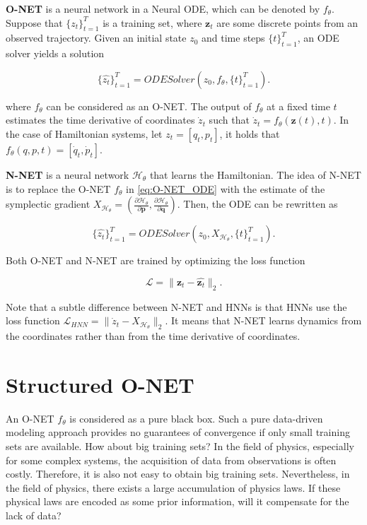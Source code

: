 \documentclass[
	parskip, 			   %
	twoside, 			   %
	DIV=14, 			   %
	BCOR=15.0mm, 		   %
	headsepline, 		   %
	open=right, 		   %
	captions=tableheading, %
	bibliography=totoc,    %
	numbers=noenddot       %
]{scrreprt}
\begin{document}
\textbf{O-NET} is a neural network in a Neural ODE, which can be denoted by $f_{\theta}$. Suppose that $\{ z_{t} \}_{t=1}^{T}$ is a training set, where $\mathbf{z}_{t}$ are some discrete points from an observed trajectory. Given an initial state $z_{0}$ and time steps $\{ t \}_{t=1}^{T}$, an ODE solver yields a solution

\begin{equation}
    \label{eq:O-NET_ODE}
    \{ \hat{z_{t}} \}_{t=1}^{T} = ODESolver(z_{0}, f_{\theta}, \{ t \}_{t=1}^{T}).
\end{equation}

where $f_{\theta}$ can be considered as an O-NET. The output of $f_{\theta}$ at a fixed time $t$ estimates the time derivative of coordinates $\dot z_{t}$ such that $\dot z_{t} = f_{\theta}(\mathbf{z}(t), t)$. In the case of Hamiltonian systems, let $z_{t} = [q_{t}, p_{t}]$, it holds that $f_{\theta}(q, p, t) = [\dot q_{t}, \dot p_{t}]$.


\textbf{N-NET} is a neural network $\mathcal{H}_{\theta}$ that learns the Hamiltonian. The idea of N-NET is to replace the O-NET $f_{\theta}$ in \ref{eq:O-NET_ODE} with the estimate of the symplectic gradient $X_{\mathcal{H}_{\theta}}=(\frac{\partial \mathcal{H}_{\theta}}{\partial \mathbf{p}}, \frac{\partial \mathcal{H}_{\theta}}{\partial \mathbf{q}})$. Then, the ODE can be rewritten as

\begin{equation}
    \label{eq:H-NET_ODE}
    \{ \hat{z_{t}} \}_{t=1}^{T} = ODESolver(z_{0}, X_{\mathcal{H}_{\theta}}, \{ t \}_{t=1}^{T}).
\end{equation}


Both O-NET and N-NET are trained by optimizing the loss function

\begin{equation}
    \label{eq:loss_O-NET}
    \mathcal{L} = \lVert \mathbf{z}_{t} - \hat{\mathbf{z}_{t}} \rVert_{2}.
\end{equation}

Note that a subtle difference between N-NET and HNNs is that HNNs use the loss function $\mathcal{L}_{HNN} = \lVert \dot z_{t} - X_{\mathcal{H}_{\theta}} \rVert_{2}$. It means that N-NET learns dynamics from the coordinates rather than from the time derivative of coordinates.


\section{Structured O-NET}
An O-NET $f_{\theta}$ is considered as a pure black box. Such a pure data-driven modeling approach provides no guarantees of convergence if only small training sets are available. How about big training sets? In the field of physics, especially for some complex systems, the acquisition of data from observations is often costly. Therefore, it is also not easy to obtain big training sets. Nevertheless, in the field of physics, there exists a large accumulation of physics laws. If these physical laws are encoded as some prior information, will it compensate for the lack of data?
\end{document}
